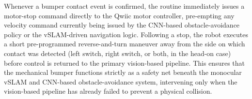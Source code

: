 Whenever a bumper contact event is confirmed, the routine immediately issues a motor-stop command directly to the Qwiic motor controller, pre-empting any velocity command currently being issued by the CNN-based obstacle-avoidance policy or the vSLAM-driven navigation logic. Following a stop, the robot executes a short pre-programmed reverse-and-turn maneuver away from the side on which contact was detected (left switch, right switch, or both, in the head-on case) before control is returned to the primary vision-based pipeline. This ensures that the mechanical bumper functions strictly as a safety net beneath the monocular vSLAM and CNN-based obstacle-avoidance system, intervening only when the vision-based pipeline has already failed to prevent a physical collision.

